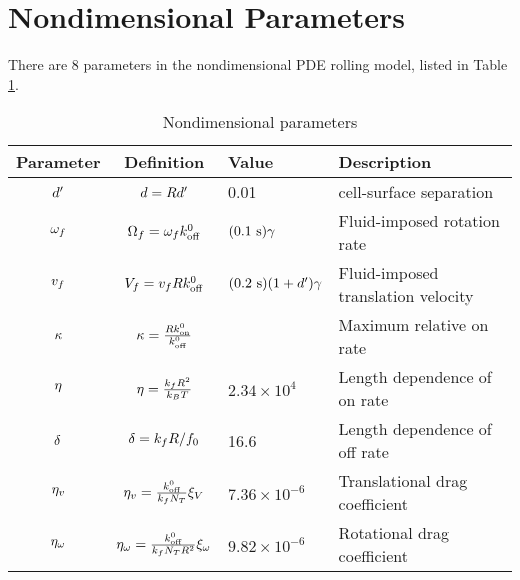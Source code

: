 \documentclass{article}
\begin{document}
\section{Nondimensional Parameters}
\label{sec:nd-params}

There are 8 parameters in the nondimensional PDE rolling model, listed
in Table \ref{tab:nd-params}.

\begin{table}
  \centering
  \begin{tabular}{c|c|l|l}
    Parameter & Definition & Value & Description \\ \hline
    $d'$ & $d = Rd'$ & 0.01
                                   & cell-surface separation \\
    $\omega_f$ & $\Omega_f = \omega_fk_\textnormal{off}^0$
                           & $(0.1 \text{ s})\gamma$ & Fluid-imposed
                                                       rotation rate
    \\
    $v_f$ & $V_f = v_fRk_\textnormal{off}^0$
                           & $(0.2 \text{ s}) (1 + d')
                             \gamma$
                                   & Fluid-imposed translation
                                     velocity \\
    $\kappa$ & $\kappa = \frac{Rk_\textnormal{on}^0}{k_\textnormal{off}^0}$
                           &  & Maximum relative on rate \\
    $\eta$ & $\eta =
                    \frac{k_fR^2}{k_BT}$
                           & $2.34 \times 10^4$ & Length dependence of
                                                  on rate \\
    $\delta$ & $\delta = k_fR/f_0$
                           & 16.6 & Length dependence of off rate \\
    $\eta_v$ & $\eta_v =
                     \frac{k_\textnormal{off}^0}{k_fN_T}
                       \xi_V$ & $7.36 \times 10^{-6}$
                                   & Translational drag coefficient \\
    $\eta_\omega$ & $\eta_\omega =
                     \frac{k_\textnormal{off}^0}{k_fN_T
                                      R^2}\xi_\omega$
                           & $9.82 \times 10^{-6}$ & Rotational drag
                                                     coefficient
  \end{tabular}
  \caption{Nondimensional parameters}
  \label{tab:nd-params}
\end{table}


\end{document}
